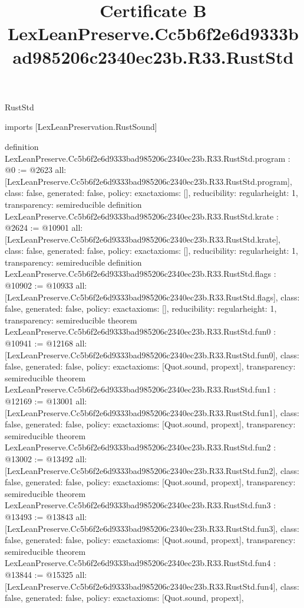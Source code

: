 \begin{lexlean}{RustStd}
\title{Certificate B LexLeanPreserve.Cc5b6f2e6d9333bad985206c2340ec23b.R33.RustStd}
\begin{coremodule}
imports [LexLeanPreservation.RustSound]

definition LexLeanPreserve.Cc5b6f2e6d9333bad985206c2340ec23b.R33.RustStd.program : @0 := @2623 {
  all: [LexLeanPreserve.Cc5b6f2e6d9333bad985206c2340ec23b.R33.RustStd.program],
  class: false,
  generated: false,
  policy: exact{axioms: []},
  reducibility: regular{height: 1},
  transparency: semireducible
}
definition LexLeanPreserve.Cc5b6f2e6d9333bad985206c2340ec23b.R33.RustStd.krate : @2624 := @10901 {
  all: [LexLeanPreserve.Cc5b6f2e6d9333bad985206c2340ec23b.R33.RustStd.krate],
  class: false,
  generated: false,
  policy: exact{axioms: []},
  reducibility: regular{height: 1},
  transparency: semireducible
}
definition LexLeanPreserve.Cc5b6f2e6d9333bad985206c2340ec23b.R33.RustStd.flags : @10902 := @10933 {
  all: [LexLeanPreserve.Cc5b6f2e6d9333bad985206c2340ec23b.R33.RustStd.flags],
  class: false,
  generated: false,
  policy: exact{axioms: []},
  reducibility: regular{height: 1},
  transparency: semireducible
}
theorem LexLeanPreserve.Cc5b6f2e6d9333bad985206c2340ec23b.R33.RustStd.fun0 : @10941 := @12168 {
  all: [LexLeanPreserve.Cc5b6f2e6d9333bad985206c2340ec23b.R33.RustStd.fun0],
  class: false,
  generated: false,
  policy: exact{axioms: [Quot.sound, propext]},
  transparency: semireducible
}
theorem LexLeanPreserve.Cc5b6f2e6d9333bad985206c2340ec23b.R33.RustStd.fun1 : @12169 := @13001 {
  all: [LexLeanPreserve.Cc5b6f2e6d9333bad985206c2340ec23b.R33.RustStd.fun1],
  class: false,
  generated: false,
  policy: exact{axioms: [Quot.sound, propext]},
  transparency: semireducible
}
theorem LexLeanPreserve.Cc5b6f2e6d9333bad985206c2340ec23b.R33.RustStd.fun2 : @13002 := @13492 {
  all: [LexLeanPreserve.Cc5b6f2e6d9333bad985206c2340ec23b.R33.RustStd.fun2],
  class: false,
  generated: false,
  policy: exact{axioms: [Quot.sound, propext]},
  transparency: semireducible
}
theorem LexLeanPreserve.Cc5b6f2e6d9333bad985206c2340ec23b.R33.RustStd.fun3 : @13493 := @13843 {
  all: [LexLeanPreserve.Cc5b6f2e6d9333bad985206c2340ec23b.R33.RustStd.fun3],
  class: false,
  generated: false,
  policy: exact{axioms: [Quot.sound, propext]},
  transparency: semireducible
}
theorem LexLeanPreserve.Cc5b6f2e6d9333bad985206c2340ec23b.R33.RustStd.fun4 : @13844 := @15325 {
  all: [LexLeanPreserve.Cc5b6f2e6d9333bad985206c2340ec23b.R33.RustStd.fun4],
  class: false,
  generated: false,
  policy: exact{axioms: [Quot.sound, propext]},
}
\end{coremodule}
\end{lexlean}
